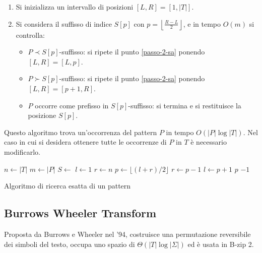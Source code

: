 \begin{enumerate}
    \item Si inizializza un intervallo di posizioni $[L,R] = [1, |T|]$.
    \item \label{passo-2-sa} Si considera il suffisso di indice $S[p]$ con
          $p = \left\lfloor \frac{R - L}{2} \right\rfloor$, e in tempo $O(m)$ si
          controlla:
          \begin{itemize}
              \item $P \prec S[p]$-suffisso: si ripete il punto \ref{passo-2-sa}
                    ponendo $[L, R] = [L, p]$.
              \item $P \succ S[p]$-suffisso: si ripete il punto \ref{passo-2-sa}
                    ponendo $[L, R] = [p + 1, R]$.
              \item $P$ occorre come prefisso in $S[p]$-suffisso: si termina e
                    si restituisce la posizione $S[p]$.
          \end{itemize}
\end{enumerate}
Questo algoritmo trova un'occorrenza del pattern $P$ in tempo $O(|P| \log |T|)$.
Nel caso in cui si desidera ottenere tutte le occorrenze di $P$ in $T$ è
necessario modificarlo.
\begin{algorithm}[!ht]
    \begin{algorithmic}
        \State $n \gets |T|$
        \State $m \gets |P|$
        \State $S \gets$ 
        \State $l \gets 1$
        \State $r \gets n$
        \State $p \gets \lfloor (l + r) / 2 \rfloor$
        \State $r \gets p - 1$
        \State $l \gets p + 1$
        \Else
        \State \Return $p$
        \EndIf
        \EndWhile
        \State \Return $-1$
        \EndFunction
    \end{algorithmic}
    \caption{Algoritmo di ricerca esatta di un pattern}
\end{algorithm}
\subsection{Burrows Wheeler Transform}
Proposta da Burrows e Wheeler nel '94, costruisce una permutazione reversibile
dei simboli del testo, occupa uno spazio di $\Theta(|T| \log |\Sigma|)$ ed è
usata in B-zip 2.

